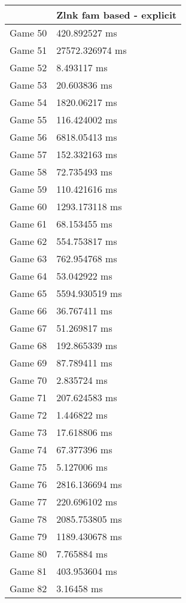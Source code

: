 \begin{tabular}{|l|l|}
	\hline
	& Zlnk fam based - explicit \\ \hline
	Game 50 & 420.892527 ms \\ \hline
	Game 51 & 27572.326974 ms \\ \hline
	Game 52 & 8.493117 ms \\ \hline
	Game 53 & 20.603836 ms \\ \hline
	Game 54 & 1820.06217 ms \\ \hline
	Game 55 & 116.424002 ms \\ \hline
	Game 56 & 6818.05413 ms \\ \hline
	Game 57 & 152.332163 ms \\ \hline
	Game 58 & 72.735493 ms \\ \hline
	Game 59 & 110.421616 ms \\ \hline
	Game 60 & 1293.173118 ms \\ \hline
	Game 61 & 68.153455 ms \\ \hline
	Game 62 & 554.753817 ms \\ \hline
	Game 63 & 762.954768 ms \\ \hline
	Game 64 & 53.042922 ms \\ \hline
	Game 65 & 5594.930519 ms \\ \hline
	Game 66 & 36.767411 ms \\ \hline
	Game 67 & 51.269817 ms \\ \hline
	Game 68 & 192.865339 ms \\ \hline
	Game 69 & 87.789411 ms \\ \hline
	Game 70 & 2.835724 ms \\ \hline
	Game 71 & 207.624583 ms \\ \hline
	Game 72 & 1.446822 ms \\ \hline
	Game 73 & 17.618806 ms \\ \hline
	Game 74 & 67.377396 ms \\ \hline
	Game 75 & 5.127006 ms \\ \hline
	Game 76 & 2816.136694 ms \\ \hline
	Game 77 & 220.696102 ms \\ \hline
	Game 78 & 2085.753805 ms \\ \hline
	Game 79 & 1189.430678 ms \\ \hline
	Game 80 & 7.765884 ms \\ \hline
	Game 81 & 403.953604 ms \\ \hline
	Game 82 & 3.16458 ms \\ \hline

\end{tabular}
